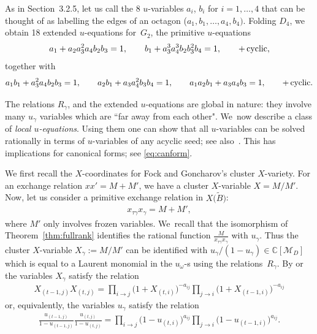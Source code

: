\documentclass[pdftex]{sigma}%
\def\C{{\mathbb C}}
\def\tB{{\tilde B}}
\def\M{{\mathcal{M}}}
\def\tB{{\tilde B}}
\numberwithin{equation}{section}
\begin{document}
\medskip{} %
As in Section~{3.2.5}, let us call the 8 $u$-variables $a_i$, $b_i$ for $i=1,\dots,4$ that can be thought of as labelling the edges of an octagon ($a_1,b_1,\dots,a_4,b_4)$. Folding $D_4$, we obtain 18 extended $u$-equations for~$G_2$, the primitive $u$-equations
\begin{gather*}
a_1 + a_2 a_3^2 a_4 b_2 b_3=1,\qquad b_1 + a_3^3 a_4^3 b_2 b_3^2 b_4=1, \qquad
{\rm + \, cyclic},
\end{gather*}
together with
\begin{gather*}
a_1 b_1 + a_3^2 a_4 b_2 b_3=1,\qquad a_2 b_1 + a_3 a_4^2 b_3 b_4=1,\qquad a_1 a_2 b_1 + a_3 a_4 b_3=1, \qquad
{\rm + \, cyclic}.
\end{gather*}

\bigskip{} %
The relations $R_\gamma$, and the extended $u$-equations are global in nature: they involve many $u_\gamma$ variables which are ``far away from each other". We~now describe a class of {\it local $u$-equations}. Using them one can show that all $u$-variables can be solved rationally in terms of $u$-variables of any acyclic seed; see also~\cite{AHLT}. This has implications for canonical forms; see \eqref{eq:canform}.

We first recall the $X$-coordinates for Fock and Goncharov's cluster $X$-variety. For an exchange relation $x x' = M + M'$, we have a cluster $X$-variable $X=M/M'$. Now, let us consider a primitive exchange relation in $X\big(\tB\big)$:
\begin{gather*}
x_{\tau \gamma} x_{\gamma} = M + M',
\end{gather*}
where $M'$ only involves frozen variables. We~recall that the isomorphism of Theorem~\ref{thm:fullrank} identifies the rational function $\frac{M}{x_{\tau \gamma} x_{\gamma}}$ with $u_\gamma$. Thus the cluster $X$-variable $X_\gamma:= M/M'$ can be identified with $u_\gamma/(1-u_\gamma) \in \C[\M_D]$ which is equal to a Laurent monomial in the $u_\omega$-s using the relations~$R_\gamma$. By \cite{FZY} or \cite[Proposition~3.9 or equation~(8.11)]{CA4} the variables $X_\gamma$ satisfy the relation
\begin{gather}\label{eq:localX}
X_{(t-1,j)} X_{(t,j)} = \prod_{i \to j} \big(1+X_{(t,i)}\big)^{-a_{ij}} \prod_{j \to i} \big(1+ X_{(t-1,i)}\big)^{-a_{ij}}
\end{gather}
or, equivalently, the variables $u_\gamma$ satisfy the relation
\begin{gather*}%
\frac{u_{(t-1,j)} }{1-u_{(t-1,j)} } \frac{u_{(t,j)} }{1-u_{(t,j)} }= \prod_{i \to j} \big(1-u_{(t,i)}\big)^{a_{ij}} \prod_{j \to i} \big(1-u_{(t-1,i)}\big)^{a_{ij}}.
\end{gather*}
\end{document}
